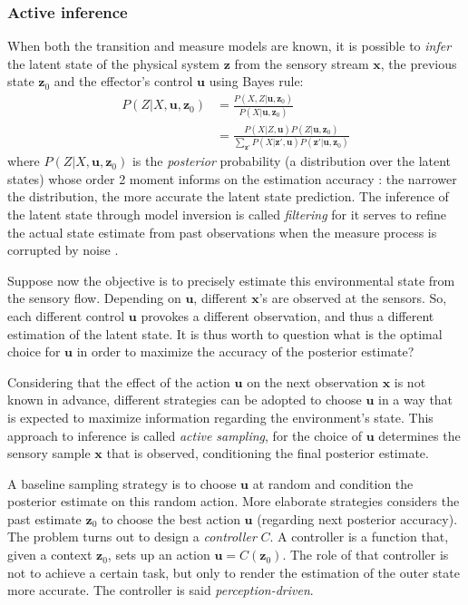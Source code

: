 \documentclass{article}
\begin{document}
\subsubsection{Active inference}
When both the transition and measure models are known, it is possible to \emph{infer} the latent state of the physical system $\boldsymbol{z}$ from the sensory stream $\boldsymbol{x}$, the previous state $\boldsymbol{z}_0$ and the effector's control $\boldsymbol{u}$ using Bayes rule:
\begin{align}
P(Z|X,\boldsymbol{u},\boldsymbol{z}_0) &= \frac{P(X,Z|\boldsymbol{u},\boldsymbol{z}_0)}{P(X|\boldsymbol{u},\boldsymbol{z}_0)}\nonumber\\
&= \frac{P(X|Z,\boldsymbol{u}) P(Z|\boldsymbol{u},\boldsymbol{z}_0)}{\sum_{\boldsymbol{z}'}P(X|\boldsymbol{z}',\boldsymbol{u}) P(\boldsymbol{z}'|\boldsymbol{u},\boldsymbol{z}_0)}\label{eq:post}
\end{align}
where $P(Z|X,\boldsymbol{u},\boldsymbol{z}_0)$ is the \emph{posterior} probability (a distribution over the latent states) whose order 2 moment informs on the estimation accuracy : the narrower the distribution, the more accurate the latent state prediction. The inference of the latent state through model inversion is called \emph{filtering} for it serves to refine the actual state estimate from past observations when the measure process is corrupted by noise \cite{Kalman1960}.

Suppose now the objective is to precisely estimate this environmental state from the sensory flow. %
Depending on $\boldsymbol{u}$, different $\boldsymbol{x}$'s are observed at the sensors. So, each different control $\boldsymbol{u}$ provokes a different observation, and thus a different 
estimation of the latent state. It is thus worth to question what is the optimal choice for $\boldsymbol{u}$ in order to maximize the accuracy of the posterior estimate?

Considering that the effect of the action $\boldsymbol{u}$ on the next observation $\boldsymbol{x}$ is not known in advance, different strategies can be adopted to choose $\boldsymbol{u}$ in a way that is expected to maximize information regarding the environment's state. This approach to inference is called \emph{active sampling}, for the choice of $\boldsymbol{u}$ determines the sensory sample $\boldsymbol{x}$ that is observed, conditioning the final posterior estimate.

A baseline sampling strategy is to choose $\boldsymbol{u}$ at random and condition the posterior  estimate on this random action. 
More elaborate strategies considers the past estimate $\boldsymbol{z}_0$ to choose the best action $\boldsymbol{u}$ (regarding next posterior accuracy). The problem turns out to design  a \emph{controller} $C$. A controller is a function that, given a context $\boldsymbol{z}_0$, sets up an action $\boldsymbol{u} = C(\boldsymbol{z}_0)$. The role of that controller is not to achieve a certain task, but only to render the estimation of the outer state more accurate. The controller is said \emph{perception-driven}. 
\end{document}
